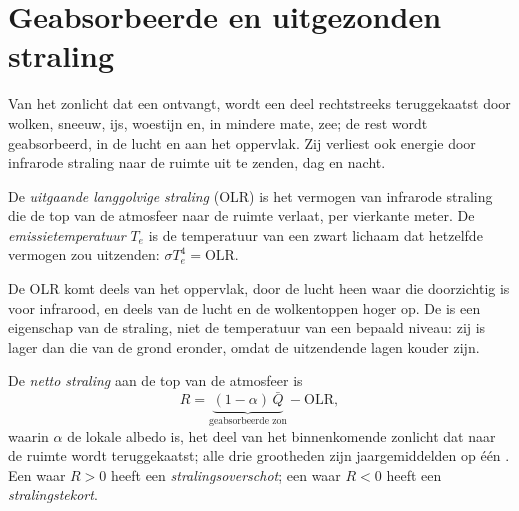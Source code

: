\section{Geabsorbeerde en uitgezonden straling}\label{sec:b1:radiation-heat-transport:toa}

Van het zonlicht dat een  ontvangt, wordt een deel rechtstreeks teruggekaatst door wolken, sneeuw, ijs, woestijn en, in mindere mate, zee; de rest wordt geabsorbeerd, in de lucht en aan het oppervlak. Zij verliest ook energie door infrarode straling naar de ruimte uit te zenden, dag en nacht.

\begin{definition}\label{def:b1:radiation-heat-transport:olr}
De \emph{uitgaande langgolvige straling} (OLR) is het vermogen van infrarode straling die de top van de atmosfeer naar de ruimte verlaat, per vierkante meter. De \emph{emissietemperatuur} $T_e$ is de temperatuur van een zwart lichaam dat hetzelfde vermogen zou uitzenden: $\sigma T_e^4 = \text{OLR}$.
\end{definition}

De OLR komt deels van het oppervlak, door de lucht heen waar die doorzichtig is voor infrarood, en deels van de lucht en de wolkentoppen hoger op. De  is een eigenschap van de straling, niet de temperatuur van een bepaald niveau: zij is lager dan die van de grond eronder, omdat de uitzendende lagen kouder zijn.

\begin{definition}\label{def:b1:radiation-heat-transport:net-radiation}
De \emph{netto straling} aan de top van de atmosfeer is
\[
  R = \underbrace{(1 - \alpha)\,\bar Q}_{\text{geabsorbeerde zon}} - \text{OLR},
\]
waarin $\alpha$ de lokale albedo is, het deel van het binnenkomende zonlicht dat naar de ruimte wordt teruggekaatst; alle drie grootheden zijn jaargemiddelden op één . Een  waar $R > 0$ heeft een \emph{stralingsoverschot}; een waar $R < 0$
heeft een \emph{stralingstekort}.
\end{definition}

